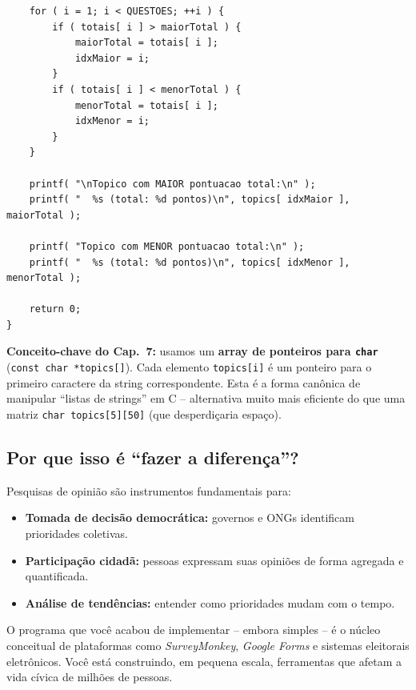 \documentclass[12pt,a4paper]{article}
\begin{document}
\begin{respostabox}
\begin{lstlisting}
    for ( i = 1; i < QUESTOES; ++i ) {
        if ( totais[ i ] > maiorTotal ) {
            maiorTotal = totais[ i ];
            idxMaior = i;
        }
        if ( totais[ i ] < menorTotal ) {
            menorTotal = totais[ i ];
            idxMenor = i;
        }
    }

    printf( "\nTopico com MAIOR pontuacao total:\n" );
    printf( "  %s (total: %d pontos)\n", topics[ idxMaior ], maiorTotal );

    printf( "Topico com MENOR pontuacao total:\n" );
    printf( "  %s (total: %d pontos)\n", topics[ idxMenor ], menorTotal );

    return 0;
}
\end{lstlisting}

\textbf{Conceito-chave do Cap.~7:} usamos um \textbf{array de ponteiros para
\texttt{char}} (\texttt{const char *topics[]}). Cada elemento \texttt{topics[i]} é
um ponteiro para o primeiro caractere da string correspondente. Esta é a forma
canônica de manipular ``listas de strings'' em C -- alternativa muito mais eficiente
do que uma matriz \texttt{char topics[5][50]} (que desperdiçaria espaço).
\end{respostabox}

\subsection*{Por que isso é ``fazer a diferença''?}

\begin{tcolorbox}[colback=ecolightgreen,colframe=ecogreen,
  title={\bfseries Computação a serviço da democracia}]

Pesquisas de opinião são instrumentos fundamentais para:
\begin{itemize}[noitemsep]
  \item \textbf{Tomada de decisão democrática:} governos e ONGs identificam
  prioridades coletivas.
  \item \textbf{Participação cidadã:} pessoas expressam suas opiniões de forma
  agregada e quantificada.
  \item \textbf{Análise de tendências:} entender como prioridades mudam com o tempo.
\end{itemize}

O programa que você acabou de implementar -- embora simples -- é o núcleo
conceitual de plataformas como \textit{SurveyMonkey}, \textit{Google Forms} e
sistemas eleitorais eletrônicos. Você está construindo, em pequena escala,
ferramentas que afetam a vida cívica de milhões de pessoas.
\end{tcolorbox}
\end{document}
